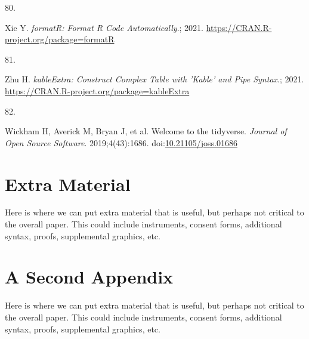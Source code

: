 \documentclass[11pt]{umnthesis}
\newlength{\csllabelwidth}
\newlength{\cslhangindent}
\newenvironment{CSLReferences}[2] %
 {%
  \setlength{\parindent}{0pt}
  \ifodd #1 \everypar{\setlength{\hangindent}{\cslhangindent}}\ignorespaces\fi
  \ifnum #2 > 0
  \setlength{\parskip}{#2\baselineskip}
  \fi
 }%
 {}
\newcommand{\CSLLeftMargin}[1]{\parbox[t]{\csllabelwidth}{#1}}
\newcommand{\CSLRightInline}[1]{\parbox[t]{\linewidth - \csllabelwidth}{#1}}
\begin{document}
\begin{CSLReferences}{0}{0}
\leavevmode{}%
\CSLLeftMargin{80. }
\CSLRightInline{Xie Y. \emph{{formatR}: Format {R} Code Automatically}.; 2021. \url{https://CRAN.R-project.org/package=formatR}}

\leavevmode{}%
\CSLLeftMargin{81. }
\CSLRightInline{Zhu H. \emph{{kableExtra}: Construct Complex Table with 'Kable' and Pipe Syntax}.; 2021. \url{https://CRAN.R-project.org/package=kableExtra}}

\leavevmode{}%
\CSLLeftMargin{82. }
\CSLRightInline{Wickham H, Averick M, Bryan J, et al. Welcome to the {tidyverse}. \emph{Journal of Open Source Software}. 2019;4(43):1686. doi:\href{https://doi.org/10.21105/joss.01686}{10.21105/joss.01686}}

\end{CSLReferences}

\setlength{\parindent}{0.20in}
\setlength{\leftskip}{0pt}

\hypertarget{appendix-appendix}{%
\appendix}


\hypertarget{appendix-a}{%
\chapter{Extra Material}\label{appendix-a}}


Here is where we can put extra material that is useful, but perhaps not critical to the overall paper. This could include instruments, consent forms, additional syntax, proofs, supplemental graphics, etc.

\hypertarget{appendix-b}{%
\chapter{A Second Appendix}\label{appendix-b}}

Here is where we can put extra material that is useful, but perhaps not critical to the overall paper. This could include instruments, consent forms, additional syntax, proofs, supplemental graphics, etc.
\end{document}
